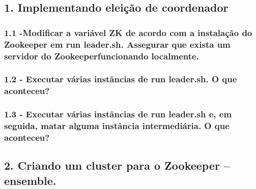 \subsection*{1. Implementando eleição de coordenador}

\subsubsection{1.1 -Modificar a variável ZK de acordo com a instalação do Zookeeper em
run leader.sh. Assegurar que exista um servidor do Zookeeperfuncionando localmente.}

\subsubsection{1.2 - Executar várias instâncias de run leader.sh. O que aconteceu?}

\subsubsection{1.3 - Executar várias instâncias de run leader.sh e, em seguida, matar
alguma instância intermediária. O que aconteceu?}


\subsection*{2. Criando um cluster para o Zookeeper – ensemble.}

